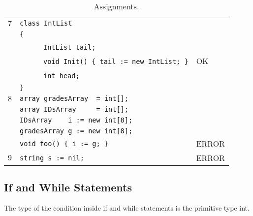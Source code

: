 \documentclass{article}
\begin{document}
\begin{table}[h]
\begin{tabular}{|l|l|l|}
 $7$ & \verb"class IntList"                               &    \\
     & \verb"{"                                           &    \\
     & ~ ~ ~ ~\verb"IntList tail;"                        &    \\
     & ~ ~ ~ ~\verb"void Init() { tail := new IntList; }" & OK \\
     & ~ ~ ~ ~\verb"int head;"                            &    \\
     & \verb"}"                                           &    \\
\hline
 $8$ & \verb"array gradesArray  = int[];"   &       \\
     & \verb"array IDsArray     = int[];"   &       \\
     & \verb"IDsArray    i := new int[8];" &       \\
     & \verb"gradesArray g := new int[8];" &       \\
     & \verb"void foo() { i := g; }"       & ERROR \\
\hline
 $9$ & \verb"string s := nil;" & ERROR \\
\hline
\end{tabular}
\caption{Assignments.
\label{Table_Code_Examples_Assignments}}
\end{table}
\subsection{If and While Statements}
\label{subsection_If_And_While_Statements}
The type of the condition inside if and while statements is the primitive type int.
\end{document}
